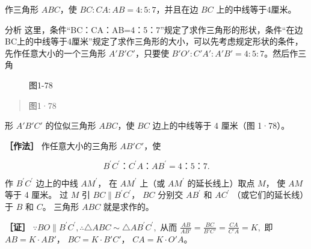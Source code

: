 作三角形 \(ABC\)，使 \(BC:CA:AB=4:5:7\)，并且在边 \(BC\)
上的中线等于4厘米。

分析
这里，条件``BC：CA：AB=4：5：7''规定了求作三角形的形状，条件``在边BC上的中线等于4厘米''规定了求作三角形的大小，可以先考虑规定形状的条件，先作任意大小的一个三角形
\(A'B'C'\)，只要使 \(B'O':C'A':A'B'=4:5:7\)。然后作三角

\begin{figure}
\centering
{}
\caption{图1-78}
\end{figure}

\begin{quote}
图1·78
\end{quote}

形 \(A'B'C'\) 的位似三角形 \(ABC\)，使 \(BC\) 边上的中线等于 4 厘米（图
1·78）。

\textbf{［作法］} 作任意大小的三角形 \(AB'C'\)，使

\[
B ^ {\prime} C ^ {\prime}\text{：} C ^ {\prime} A\text{：} A B ^ {\prime} = 4\text{：} 5\text{：} 7.
\]

作 \(B^{\prime}C^{\prime}\) 边上的中线 \(AM^{\prime}\)， 在
\(AM^{\prime}\) 上（或 \(AM^{\prime}\) 的延长线上）取点 \(M\)， 使
\(AM\) 等于 4 厘米。 过 \(M\) 引 \(BC \parallel B^{\prime}C^{\prime}\)，
\(BC\) 分别交 \(AB^{\prime}\) 和 \(AC^{\prime}\) （或它们的延长线）于
\(B\) 和 \(C\)。 三角形 \(ABC\) 就是求作的。

\textbf{［证］}
\(\because BO \parallel B^{\prime}C^{\prime},\therefore \triangle ABC\sim \triangle AB^{\prime}C^{\prime},\)
从而 \(\frac{AB}{AB'} = \frac{BC}{B'C'} = \frac{CA}{C'A} = K,\) 即
\(AB = K \cdot AB'\)， \(BC = K \cdot B'C'\)， \(CA = K \cdot O'A\)。

